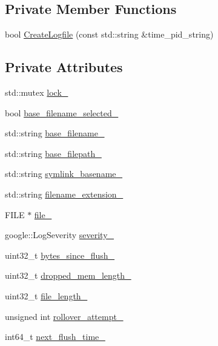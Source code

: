 \subsection*{Private Member Functions}
\begin{DoxyCompactItemize}
\item 
bool \hyperlink{classapollo_1_1cyber_1_1logger_1_1LogFileObject_abbb5038197a577095037fac0e621a54b}{Create\-Logfile} (const std\-::string \&time\-\_\-pid\-\_\-string)
\end{DoxyCompactItemize}
\subsection*{Private Attributes}
\begin{DoxyCompactItemize}
\item 
std\-::mutex \hyperlink{classapollo_1_1cyber_1_1logger_1_1LogFileObject_a963d7f19da516b4ef514e37c4d926761}{lock\-\_\-}
\item 
bool \hyperlink{classapollo_1_1cyber_1_1logger_1_1LogFileObject_aaa83cf494797e8bcfaf70ba841890628}{base\-\_\-filename\-\_\-selected\-\_\-}
\item 
std\-::string \hyperlink{classapollo_1_1cyber_1_1logger_1_1LogFileObject_a2ddb3d2bcce49c4367a18eb59bdced97}{base\-\_\-filename\-\_\-}
\item 
std\-::string \hyperlink{classapollo_1_1cyber_1_1logger_1_1LogFileObject_a74857bfefb3231e64de3c43c05e6609d}{base\-\_\-filepath\-\_\-}
\item 
std\-::string \hyperlink{classapollo_1_1cyber_1_1logger_1_1LogFileObject_a5eab9f067f8b03af6d6fad057e85d063}{symlink\-\_\-basename\-\_\-}
\item 
std\-::string \hyperlink{classapollo_1_1cyber_1_1logger_1_1LogFileObject_a90ef513fcb9261914726fc5481725dcc}{filename\-\_\-extension\-\_\-}
\item 
F\-I\-L\-E $\ast$ \hyperlink{classapollo_1_1cyber_1_1logger_1_1LogFileObject_a76d70145494f68e1aa844f7013d5a7b2}{file\-\_\-}
\item 
google\-::\-Log\-Severity \hyperlink{classapollo_1_1cyber_1_1logger_1_1LogFileObject_a55b503945f312ba3315099707efee8c4}{severity\-\_\-}
\item 
uint32\-\_\-t \hyperlink{classapollo_1_1cyber_1_1logger_1_1LogFileObject_a29647683fc52c6fb388f4662b5248805}{bytes\-\_\-since\-\_\-flush\-\_\-}
\item 
uint32\-\_\-t \hyperlink{classapollo_1_1cyber_1_1logger_1_1LogFileObject_a7edba80c0f9d4b4fd4c38a775ffe8416}{dropped\-\_\-mem\-\_\-length\-\_\-}
\item 
uint32\-\_\-t \hyperlink{classapollo_1_1cyber_1_1logger_1_1LogFileObject_acadfc2b256c6c7f1d06ea76e406379eb}{file\-\_\-length\-\_\-}
\item 
unsigned int \hyperlink{classapollo_1_1cyber_1_1logger_1_1LogFileObject_a6a8883b31139aeaf0473eeaff7a71e3a}{rollover\-\_\-attempt\-\_\-}
\item 
int64\-\_\-t \hyperlink{classapollo_1_1cyber_1_1logger_1_1LogFileObject_a3b16662e6a2caf874be92e22ee1cb706}{next\-\_\-flush\-\_\-time\-\_\-}
\end{DoxyCompactItemize}
